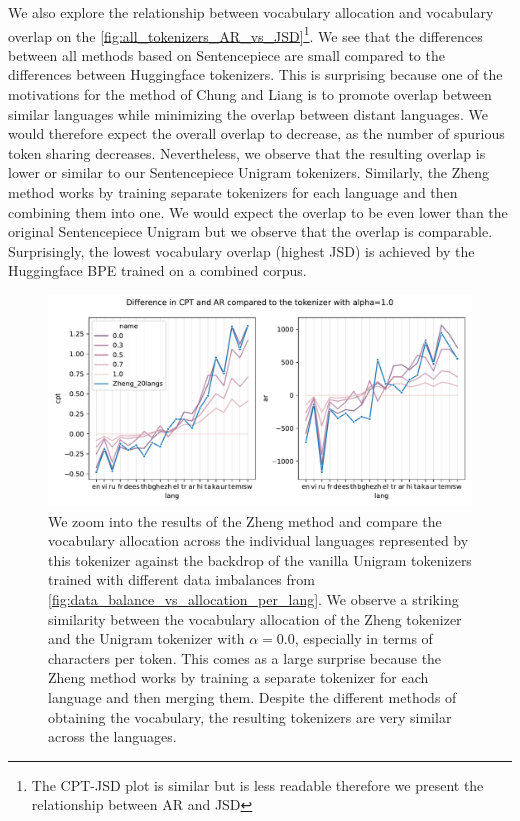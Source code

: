 We also explore the relationship between vocabulary allocation and vocabulary overlap on the \autoref{fig:all_tokenizers_AR_vs_JSD}\footnote{The CPT-JSD plot is similar but is less readable therefore we present the relationship between AR and JSD}. We see that the differences between all methods based on Sentencepiece are small compared to the differences between Huggingface tokenizers. This is surprising because one of the motivations for the method of Chung and Liang is to promote overlap between similar languages while minimizing the overlap between distant languages. We would therefore expect the overall overlap to decrease, as the number of spurious token sharing decreases. Nevertheless, we observe that the resulting overlap is lower or similar to our Sentencepiece Unigram tokenizers. Similarly, the Zheng method works by training separate tokenizers for each language and then combining them into one. We would expect the overlap to be even lower than the original Sentencepiece Unigram but we observe that the overlap is comparable. 
Surprisingly, the lowest vocabulary overlap (highest JSD) is achieved by the Huggingface BPE trained on a combined corpus. 

\begin{figure}
    \centering
    \includegraphics[width=\textwidth]{figures/zheng_vs_alphas.pdf}
    \caption{We zoom into the results of the Zheng method and compare the vocabulary allocation across the individual languages represented by this tokenizer against the backdrop of the vanilla Unigram tokenizers trained with different data imbalances from \ref{fig:data_balance_vs_allocation_per_lang}. We observe a striking similarity between the vocabulary allocation of the Zheng tokenizer and the Unigram tokenizer with $\alpha=0.0$, especially in terms of characters per token. This comes as a large surprise because the Zheng method works by training a separate tokenizer for each language and then merging them. Despite the different methods of obtaining the vocabulary, the resulting tokenizers are very similar across the languages.}
    \label{fig:zheng_vs_alphas}
\end{figure}

